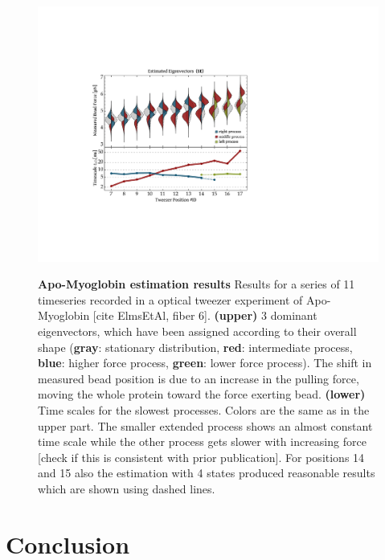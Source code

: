 \documentclass[aps,pre,twocolumn,nofootinbib,superscriptaddress,linenumbers]{revtex4-1}
\begin{document}
\begin{figure}
\includegraphics[width=1\columnwidth]{figures/ApoEstimatedTimeScales_V2}

\label{fig:ApoMyoglobin}\textbf{Apo-Myoglobin estimation results}
Results for a series of 11 timeseries recorded in a optical tweezer
experiment of Apo-Myoglobin {[}cite ElmsEtAl, fiber 6{]}. \textbf{(upper)
}3 dominant eigenvectors, which have been assigned according to their
overall shape (\textbf{gray}: stationary distribution, \textbf{red}:
intermediate process, \textbf{blue}: higher force process, \textbf{green}:
lower force process). The shift in measured bead position is due to
an increase in the pulling force, moving the whole protein toward
the force exerting bead. \textbf{(lower) }Time scales for the slowest
processes. Colors are the same as in the upper part. The smaller extended
process shows an almost constant time scale while the other process
gets slower with increasing force {[}check if this is consistent with
prior publication{]}. For positions 14 and 15 also the estimation
with 4 states produced reasonable results which are shown using dashed
lines.
\end{figure}





\section{Conclusion}
\label{section:conclusion}
\end{document}
